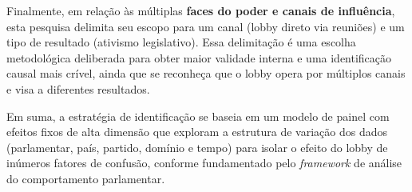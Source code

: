 Finalmente, em relação às múltiplas \textbf{faces do poder e canais de influência}, esta pesquisa delimita seu escopo para um canal (lobby direto via reuniões) e um tipo de resultado (ativismo legislativo). Essa delimitação é uma escolha metodológica deliberada para obter maior validade interna e uma identificação causal mais crível, ainda que se reconheça que o lobby opera por múltiplos canais e visa a diferentes resultados.

Em suma, a estratégia de identificação se baseia em um modelo de painel com efeitos fixos de alta dimensão que exploram a estrutura de variação dos dados (parlamentar, país, partido, domínio e tempo) para isolar o efeito do lobby de inúmeros fatores de confusão, conforme fundamentado pelo \textit{framework} de análise do comportamento parlamentar.